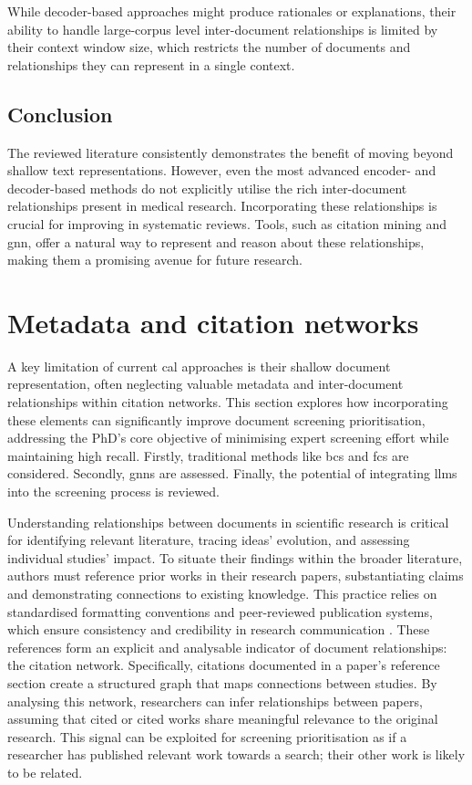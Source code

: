 \documentclass[10pt,oneside]{book}
\begin{document}
While decoder-based approaches might produce rationales or explanations, their ability to handle large-corpus level inter-document relationships is limited by their context window size, which restricts the number of documents and relationships they can represent in a single context.

\subsection{Conclusion}
The reviewed literature consistently demonstrates the benefit of moving beyond shallow text representations. However, even the most advanced encoder- and decoder-based methods do not explicitly utilise the rich inter-document relationships present in medical research.  Incorporating these relationships is crucial for improving  in systematic reviews. Tools, such as citation mining and \gls*{gnn}, offer a natural way to represent and reason about these relationships, making them a promising avenue for future research.

\section{Metadata and citation networks}\label{sec:metadata}

A key limitation of current \gls*{cal} approaches is their shallow document representation, often neglecting valuable metadata and inter-document relationships within citation networks. This section explores how incorporating these elements can significantly improve document screening prioritisation, addressing the PhD's core objective of minimising expert screening effort while maintaining high recall. Firstly, traditional methods like \gls*{bcs} and \gls*{fcs} are considered. Secondly, \glspl*{gnn} are assessed. Finally, the potential of integrating \glspl*{llm} into the screening process is reviewed.

Understanding relationships between documents in scientific research is critical for identifying relevant literature, tracing ideas' evolution, and assessing individual studies' impact. To situate their findings within the broader literature, authors must reference prior works in their research papers, substantiating claims and demonstrating connections to existing knowledge. This practice relies on standardised formatting conventions and peer-reviewed publication systems, which ensure consistency and credibility in research communication \cite{noauthor_bmc_nodate}. These references form an explicit and analysable indicator of document relationships: the citation network. Specifically, citations documented in a paper's reference section create a structured graph that maps connections between studies. By analysing this network, researchers can infer relationships between papers, assuming that cited or cited works share meaningful relevance to the original research. This signal can be exploited for screening prioritisation as if a researcher has published relevant work towards a search; their other work is likely to be related.
\end{document}
